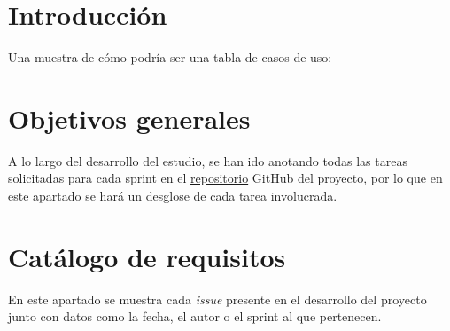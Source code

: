 
\section{Introducción}

Una muestra de cómo podría ser una tabla de casos de uso:


\section{Objetivos generales}
A lo largo del desarrollo del estudio, se han ido anotando todas las tareas solicitadas para cada sprint en el \href{https://github.com/hds1001/Estudio-y-configuracion-de-un-sistema-ELK}{repositorio} GitHub del proyecto, por lo que en este apartado se hará un desglose de cada tarea involucrada.

\section{Catálogo de requisitos}
En este apartado se muestra cada \textit{issue} presente en el desarrollo del proyecto junto con datos como la fecha, el autor o el sprint al que pertenecen.

